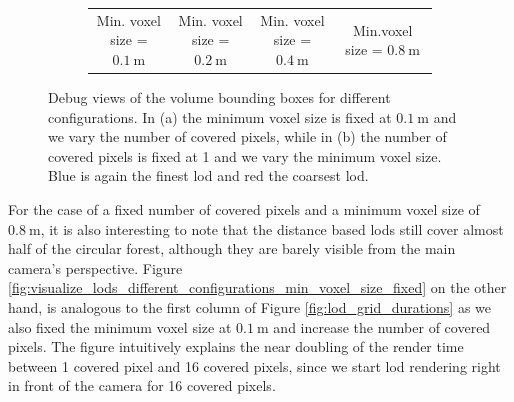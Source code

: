 \begin{figure}
\begin{subfigure}[b]{\linewidth}
\begin{center}
\begin{tabular}{ c c c c  }
                {\footnotesize Min. voxel size = $\SI{0.1}{\m}$} & {\footnotesize Min. voxel size = $\SI{0.2}{\m}$} & {\footnotesize Min. voxel size = $\SI{0.4}{\m}$} & {\footnotesize Min.\newline voxel size = $\SI{0.8}{\m}$}\\
            \end{tabular}
        \end{center}
        \caption{}
        \label{fig:visualize_lods_different_configurations_covered_pixels_fixed}
    \end{subfigure}
    \caption[Visualization of \acsp{lod} using different configurations]{Debug views of the volume bounding boxes for different configurations. In (a) the minimum voxel size is fixed at $\SI{0.1}{\m}$ and we vary the number of covered pixels, while in (b) the number of covered pixels is fixed at 1 and we vary the minimum voxel size. Blue is again the finest \ac{lod} and red the coarsest \ac{lod}. }
    \label{fig:visualize_lods_different_configurations}
\end{figure}
For the case of a fixed number of covered pixels and a minimum voxel size of $\SI{0.8}{\m}$, it is also interesting to note that the distance based \acsp{lod} still cover almost half of the circular forest, although they are barely visible from the main camera's perspective.
Figure \ref{fig:visualize_lods_different_configurations_min_voxel_size_fixed} on the other hand, is analogous to the first column of Figure \ref{fig:lod_grid_durations} as we also fixed the minimum voxel size at $\SI{0.1}{\m}$ and increase the number of covered pixels.
The figure intuitively explains the near doubling of the render time between 1 covered pixel and 16 covered pixels, since we start \ac{lod} rendering right in front of the camera for 16 covered pixels.


